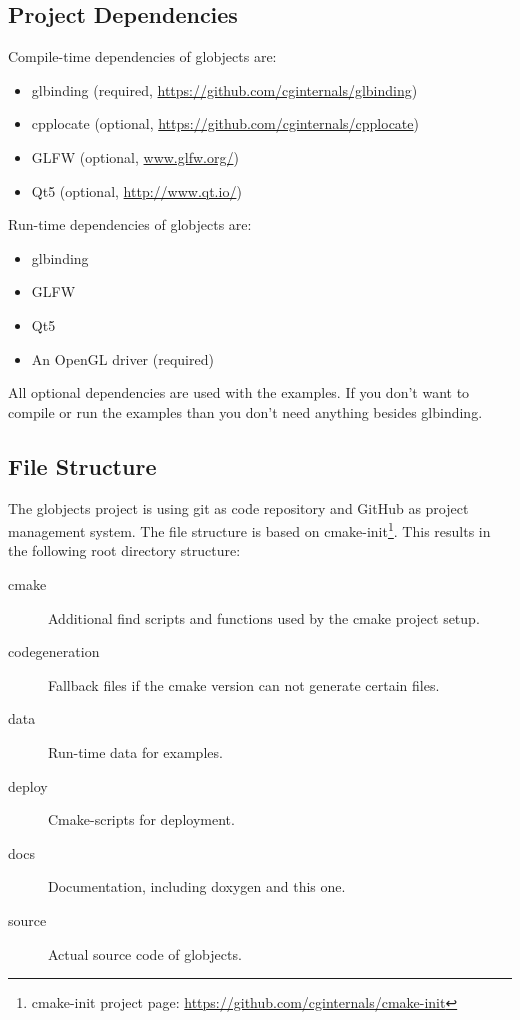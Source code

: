 \documentclass{article}
\begin{document}
\subsection{Project Dependencies}

Compile-time dependencies of globjects are:
\begin{itemize}
	\item glbinding (required, \url{https://github.com/cginternals/glbinding})
	\item cpplocate (optional, \url{https://github.com/cginternals/cpplocate})
	\item GLFW (optional, \url{www.glfw.org/})
	\item Qt5 (optional, \url{http://www.qt.io/})
\end{itemize}

Run-time dependencies of globjects are:
\begin{itemize}
	\item glbinding
	\item GLFW
	\item Qt5
	\item An OpenGL driver (required)
\end{itemize}

\noindent All optional dependencies are used with the examples. If you don't want to compile or run the examples than you don't need anything besides glbinding.

\subsection{File Structure}

The globjects project is using git as code repository and GitHub as project management system. The file structure is based on cmake-init\footnote{cmake-init project page: \url{https://github.com/cginternals/cmake-init}}. This results in the following root directory structure:
\begin{description}
	\item[cmake] Additional find scripts and functions used by the cmake project setup.
	\item[codegeneration] Fallback files if the cmake version can not generate certain files.
	\item[data] Run-time data for examples.
	\item[deploy] Cmake-scripts for deployment.
	\item[docs] Documentation, including doxygen and this one.
	\item[source] Actual source code of globjects.
\end{description}
\end{document}
